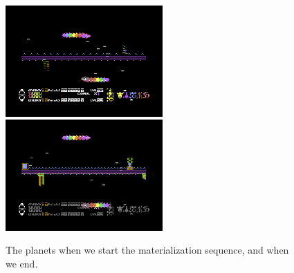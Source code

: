 \begin{figure}[H]
    \centering
      \includegraphics[width=6cm]{planets/entry_images/entry73.png}%
      \includegraphics[width=6cm]{planets/entry_images/entry255.png}%
\caption{The planets when we start the materialization sequence, and when we end.}
\end{figure}
